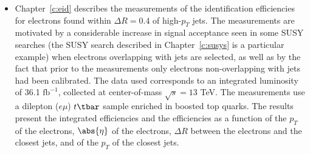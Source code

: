 \begin{itemize}[label=]
	\item Chapter~\ref{c:eid} describes the measurements of the identification
	      efficiencies for electrons found within $\Delta R = 0.4$ of high-$p_T$ jets.
	      The measurements are motivated by a considerable increase in signal acceptance
	      seen in some SUSY searches (the SUSY search described in Chapter~\ref{c:susys}
	      is a particular example) when electrons overlapping with jets are selected, as
	      well as by the fact that prior to the measurements only electrons
	      non-overlapping with jets had been calibrated. The data used corresponds to an
	      integrated luminosity of 36.1 $\text{fb}^{-1}$, collected at center-of-mass
	      $\sqrt{s} = 13$ TeV. The measurements use a dilepton ($e\mu$) $t\tbar$ sample
	      enriched in boosted top quarks. The results present the integrated efficiencies
	      and the efficiencies as a function of the $p_T$ of the electrons, $\abs{\eta}$
	      of the electrons, $\Delta R$ between the electrons and the closest jets, and of
	      the $p_T$ of the closest jets.

\end{itemize}

